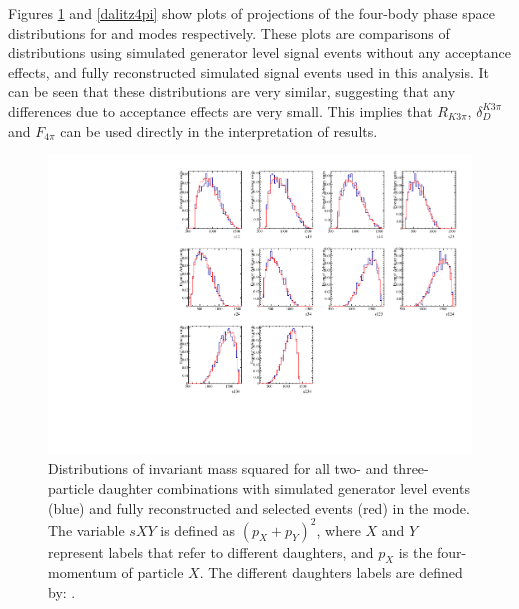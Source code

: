 Figures \ref{dalitzk3pi} and \ref{dalitz4pi} show plots of projections of the four-body phase space distributions for \kpipipi and \pipipipi modes respectively. These plots are comparisons of distributions using simulated generator level signal events without any acceptance effects, and fully reconstructed simulated signal events used in this analysis. It can be seen that these distributions are very similar, suggesting that any differences due to \lhcb acceptance effects are very small. This implies that $R_{K3\pi}$, $\delta_D^{K3\pi}$ and $F_{4\pi}$ can be used directly in the interpretation of \lhcb results.

\begin{figure}[h]
\centering
\includegraphics[width=0.9\linewidth]{figures/results/dalitzDist_KPiPiPi.pdf}
\caption{Distributions of invariant mass squared for all two- and three-particle \Dz daughter combinations with simulated generator level events (blue) and fully reconstructed and selected events (red) in the \kpipipi mode. The variable $sXY$ is defined as $(p_X + p_Y)^2$, where $X$ and $Y$ represent labels that refer to different \Dz daughters, and $p_X$ is the four-momentum of particle $X$. The different \Dz daughters labels are defined by: .}
\label{dalitzk3pi}
\end{figure}

